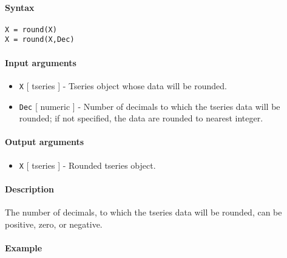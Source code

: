 


	\paragraph{Syntax}

\begin{verbatim}
X = round(X)
X = round(X,Dec)
\end{verbatim}

\paragraph{Input arguments}

\begin{itemize}
\item
  \texttt{X} {[} tseries {]} - Tseries object whose data will be
  rounded.
\item
  \texttt{Dec} {[} numeric {]} - Number of decimals to which the tseries
  data will be rounded; if not specified, the data are rounded to
  nearest integer.
\end{itemize}

\paragraph{Output arguments}

\begin{itemize}
\itemsep1pt\parskip0pt
\item
  \texttt{X} {[} tseries {]} - Rounded tseries object.
\end{itemize}

\paragraph{Description}

The number of decimals, to which the tseries data will be rounded, can
be positive, zero, or negative.

\paragraph{Example}


